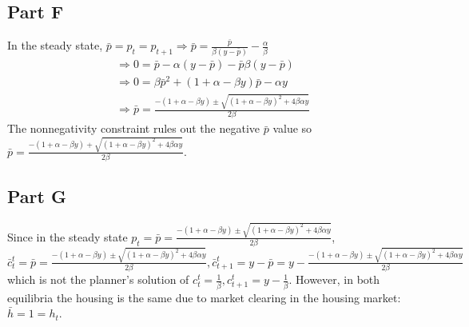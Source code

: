 \documentclass[11pt]{article} %
\begin{document}
\subsection{Part F}
In the steady state, $\bar{p} = p_t = p_{t+1} \Rightarrow \bar{p} = \frac{\bar{p}}{\beta(y-\bar{p})} - \frac{\alpha}{\beta}$
\begin{align*}
&\Rightarrow 0 =\bar{p} - \alpha(y - \bar{p}) - \bar{p}\beta(y - \bar{p})\\
&\Rightarrow 0 = \beta \bar{p}^2 +(1+\alpha - \beta y)\bar{p} - \alpha y \\
&\Rightarrow \bar{p} = \frac{-(1+\alpha - \beta y) \pm \sqrt{(1+\alpha - \beta y)^2 +4\beta \alpha y} }{2\beta} 
\end{align*}
The nonnegativity constraint rules out the negative $\bar{p}$ value so $\bar{p} = \frac{-(1+\alpha - \beta y) + \sqrt{(1+\alpha - \beta y)^2 +4\beta \alpha y} }{2\beta}.$
\subsection{Part G}
Since in the steady state $p_t = \bar{p} =  \frac{-(1+\alpha - \beta y) \pm \sqrt{(1+\alpha - \beta y)^2 +4\beta \alpha y} }{2\beta} $, $\bar{c}_t^t =\bar{p} =  \frac{-(1+\alpha - \beta y) \pm \sqrt{(1+\alpha - \beta y)^2 +4\beta \alpha y} }{2\beta}, \bar{c}_{t+1}^t = y - \bar{p} = y- \frac{-(1+\alpha - \beta y) \pm \sqrt{(1+\alpha - \beta y)^2 +4\beta \alpha y} }{2\beta} $ which is not the planner's solution of $c_t^t = \frac{1}{\beta}, c_{t+1}^t = y - \frac{1}{\beta}$. However, in both equilibria the housing is the same due to market clearing in the housing market: $\bar{h} = 1 = h_t$.
\end{document}
